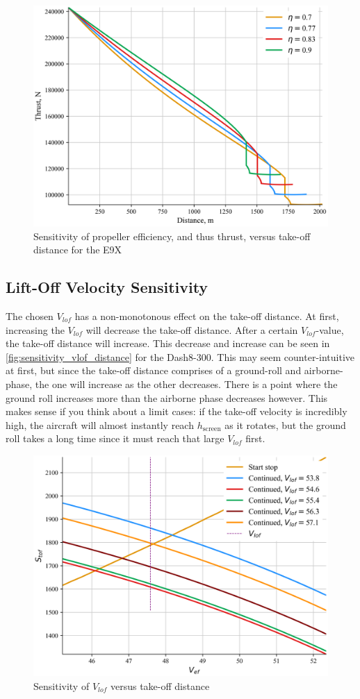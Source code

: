 \begin{figure}[!ht]
    \centering
    \includegraphics[width=0.5\linewidth]{figures/E9X_BFL_thrust_sensitivity.png}
    \caption{Sensitivity of propeller efficiency, and thus thrust, versus take-off distance for the E9X}
    \label{fig:sensitivity_efficiency_distance}
\end{figure}

\subsection{Lift-Off Velocity Sensitivity}\label{sec:sensitivity_Vlof}
The chosen $V_{lof}$ has a non-monotonous effect on the take-off distance. At first, increasing the $V_{lof}$ will decrease the take-off distance. After a certain $V_{lof}$-value, the take-off distance will increase. This decrease and increase can be seen in \autoref{fig:sensitivity_vlof_distance} for the Dash8-300. This may seem counter-intuitive at first, but since the take-off distance comprises of a ground-roll and airborne-phase, the one will increase as the other decreases. There is a point where the ground roll increases more than the airborne phase decreases however. This makes sense if you think about a limit cases: if the take-off velocity is incredibly high, the aircraft will almost instantly reach $h_\text{screen}$ as it rotates, but the ground roll takes a long time since it must reach that large $V_{lof}$ first.

\begin{figure}[!ht]
    \centering
    \includegraphics[width=0.5\linewidth]{figures/Dash8-300_BFL_Vlof_sensisivity.png}
    \caption{Sensitivity of $V_{lof}$ versus take-off distance}
    \label{fig:sensitivity_vlof_distance}
\end{figure}

